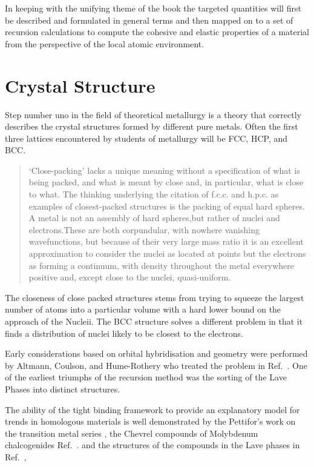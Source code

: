 In keeping with the unifying theme of the book the targeted quantities
will first be described and formulated in general terms and then mapped
on to a set of recursion calculations to compute the cohesive and elastic
properties of a material from the perspective of the local atomic environment.

\section{Crystal Structure}
Step number uno in the field of theoretical metallurgy is a theory that correctly
describes the crystal structures formed by different pure metals. 
Often the first three lattices encountered by students of metallurgy 
will be FCC, HCP, and BCC.

\begin{quote}
‘Close-packing’ lacks a unique meaning without a specification of 
what is being packed, and what is meant by close and, in particular, 
what is close to what. The thinking underlying the citation of f.c.c. 
and h.p.c. as examples of closest-packed structures is the packing of 
equal hard spheres. A metal is not an assembly of hard spheres,but rather of 
nuclei and electrons.These are both corpundular, with nowhere vanishing 
wavefunctions, but because of their very large mass ratio it is an excellent 
approximation to consider the nuclei as located at points
but the electrons as forming a continuum, with density throughout the metal 
everywhere positive and, except close to the nuclei, quasi-uniform.
\end{quote}

The closeness of close packed structures stems from trying to squeeze
the largest number of atoms into a particular volume
with a hard lower bound on the approach of the Nucleii.
The BCC structure solves a different problem in that it finds a
distribution of nuclei likely to be closest to the electrons.

Early considerations based on orbital hybridisation and geometry
were performed by Altmann, Coulson, and Hume-Rothery who treated 
the problem in Ref.~\cite{altmann57}. One of the earliest triumphs 
of the recursion method was the sorting of the Lave 
Phases \cite{haydocklaves75,johannes76} into distinct structures. 

The ability of the tight binding framework
to provide an explanatory model for trends in homologous materials is
well demonstrated by the Pettifor's work on the transition
metal series \cite{pettifor70}, the Chevrel compounds of Molybdenum 
chalcogenides Ref.~\cite{bullet77}.
and the structures of the compounds in the Lave phases 
in Ref.~\cite{johannes76},

